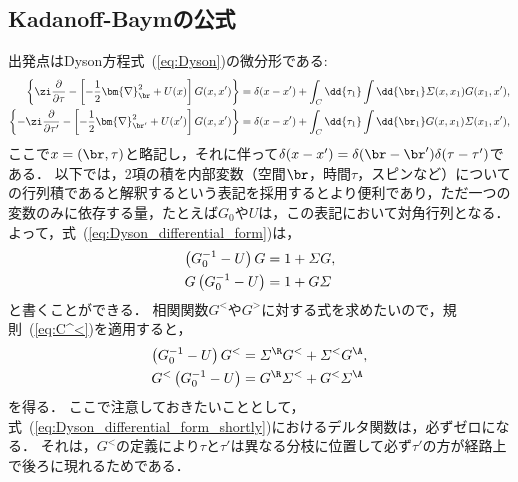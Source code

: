 \documentclass[a4paper,10pt]{jsarticle}
\begin{document}
\subsection{\label{sec:5.2}Kadanoff-Baymの公式}
出発点はDyson方程式~(\ref{eq:Dyson})の微分形である:
\begin{align}
\left\{
	\zi \frac{\partial}{\partial \tau} - \left[ - \frac{1}{2} \bm{\nabla}^2_{\br} + U (x) \right] G (x, x')
\right\}
	& = \delta (x - x')
		+ \int_{C} \dd{\tau_1} \int \dd{\br_1} \varSigma (x, x_1) G (x_1, x') 
, \notag \\
\left\{
	- \zi \frac{\partial}{\partial \tau'} - \left[ - \frac{1}{2} \bm{\nabla}^2_{\br'} + U (x') \right] G (x, x')
\right\}
	& = \delta (x - x')
		+ \int_{C} \dd{\tau_1} \int \dd{\br_1} G (x, x_1) \varSigma (x_1, x')
\label{eq:Dyson_differential_form}
,\end{align}
ここで$x = (\br, \tau)$と略記し，それに伴って$\delta (x - x') = \delta (\br - \br') \delta (\tau - \tau')$である．
以下では，2項の積を内部変数（空間$\br$，時間$\tau$，スピンなど）についての行列積であると解釈するという表記を採用するとより便利であり，ただ一つの変数のみに依存する量，たとえば$G_0$や$U$は，この表記において対角行列となる．
よって，式~(\ref{eq:Dyson_differential_form})は，
\begin{align}
\left( G_0^{-1} - U \right) G
	& = 1 + \varSigma G
, \notag \\
G \left( G_0^{-1} - U \right)
	& = 1 + G \varSigma
\label{eq:Dyson_differential_form_shortly}
\end{align}
と書くことができる．
相関関数$G^{<}$や$G^{>}$に対する式を求めたいので，規則~(\ref{eq:C^<})を適用すると，
\begin{align}
\left( G_0^{-1} - U \right) G^{<}
	& = \varSigma^{\R} G^{<} + \varSigma^{<} G^{\A}
, \notag \\
G^{<} \left( G_0^{-1} - U \right)
	& = G^{\R} \varSigma^{<} + G^{<} \varSigma^{\A}
\label{eq:5.3}
\end{align}
を得る．
ここで注意しておきたいこととして，式~(\ref{eq:Dyson_differential_form_shortly})におけるデルタ関数は，必ずゼロになる．
それは，$G^{<}$の定義により$\tau$と$\tau'$は異なる分枝に位置して必ず$\tau'$の方が経路上で後ろに現れるためである．
\end{document}
